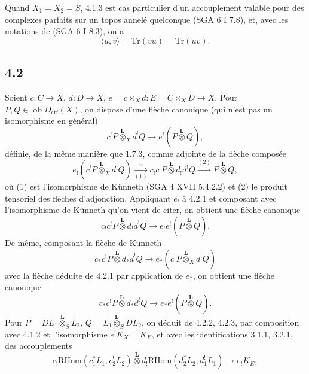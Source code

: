\documentclass[11pt]{article}
\newcommand{\ob}{\operatorname{ob}}
\providecommand{\RHom}{\mathrm{RHom}}
\providecommand{\Dctf}{D_{\mathrm{ctf}}}
\providecommand{\Dctf}{D_{\mathrm{ctf}}}
\providecommand{\RHom}{\mathrm{RHom}}
\providecommand{\ob}{\operatorname{ob}}
\begin{document}
Quand $X_1=X_2=S$, 4.1.3 est cas particulier d'un accouplement valable pour des complexes parfaits sur un topos annelé quelconque (SGA 6 I 7.8), et, avec les notations de (SGA 6 I 8.3), on a
\begin{equation}
\langle u,v\rangle=\mathrm{Tr}(vu)=\mathrm{Tr}(uv).
\tag{4.1.5}
\end{equation}

\subsection*{4.2}
Soient $c:C\to X$, $d:D\to X$, $e=c\times_Xd:E=C\times_XD\to X$. Pour $P,Q\in\ob\Dctf(X)$, on dispose d'une flèche canonique (qui n'est pas un isomorphisme en général)
\begin{equation}
c^!P\overset{\mathbf L}{\otimes}_X d^!Q
\longrightarrow e^!(P\overset{\mathbf L}{\otimes}Q),
\tag{4.2.1}
\end{equation}
définie, de la même manière que 1.7.3, comme adjointe de la flèche composée
\[
e_!(c^!P\overset{\mathbf L}{\otimes}_X d^!Q)
\xrightarrow[(1)]{\sim}
 c_!c^!P\overset{\mathbf L}{\otimes}d_!d^!Q
\xrightarrow{(2)} P\overset{\mathbf L}{\otimes}Q,
\]
où (1) est l'isomorphisme de Künneth (SGA 4 XVII 5.4.2.2) et (2) le produit tensoriel des flèches d'adjonction. Appliquant $e_!$ à 4.2.1 et composant avec l'isomorphisme de Künneth qu'on vient de citer, on obtient une flèche canonique
\begin{equation}
c_!c^!P\overset{\mathbf L}{\otimes}d_!d^!Q
\longrightarrow e_!e^!(P\overset{\mathbf L}{\otimes}Q).
\tag{4.2.2}
\end{equation}
De même, composant la flèche de Künneth
\[
c_*c^!P\overset{\mathbf L}{\otimes}d_*d^!Q
\longrightarrow e_*(c^!P\overset{\mathbf L}{\otimes}_X d^!Q)
\]
avec la flèche déduite de 4.2.1 par application de $e_*$, on obtient une flèche canonique
\begin{equation}
c_*c^!P\overset{\mathbf L}{\otimes}d_*d^!Q
\longrightarrow e_*e^!(P\overset{\mathbf L}{\otimes}Q).
\tag{4.2.3}
\end{equation}
Pour $P=DL_1\overset{\mathbf L}{\otimes}_S L_2$, $Q=L_1\overset{\mathbf L}{\otimes}_S DL_2$, on déduit de 4.2.2, 4.2.3, par composition avec 4.1.2 et l'isomorphisme $e^!K_X=K_E$, et avec les identifications 3.1.1, 3.2.1, des accouplements
\begin{equation}
c_!\RHom(c_1^*L_1,c_2^!L_2)\overset{\mathbf L}{\otimes}
 d_!\RHom(d_2^*L_2,d_1^!L_1)
\longrightarrow e_!K_E,
\tag{4.2.4}
\end{equation}
\end{document}
